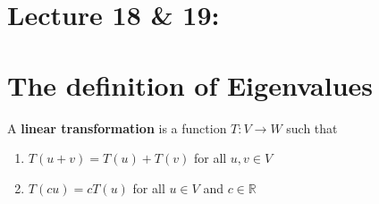 \section{Lecture 18 \& 19: }

\section{The definition of Eigenvalues}
\begin{definition}
    A \textbf{linear transformation} is a function $T: V \to W$ such that 
    \begin{enumerate}
        \item $T(u + v) = T(u) + T(v)$ for all $u, v \in V$
        \item $T(cu) = cT(u)$ for all $u \in V$ and $c \in \mathbb{R}$
    \end{enumerate}
\end{definition}















\newpage